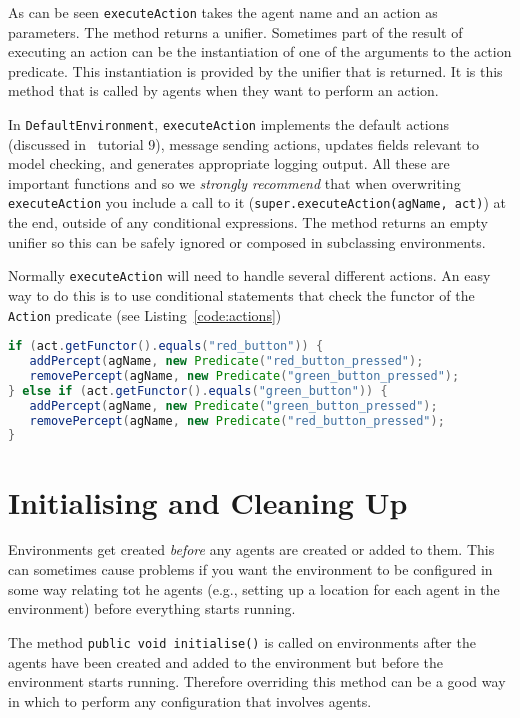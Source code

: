 \documentclass[a4]{article}
\begin{document}
As can be seen \texttt{executeAction} takes the agent name and an action as parameters.  The method returns a unifier.  Sometimes part of the result of executing an action can be the instantiation of one of the arguments to the action predicate.  This instantiation is provided by the unifier that is returned.  It is this method that is called by agents when they want to perform an action.

In \texttt{DefaultEnvironment}, \texttt{executeAction} implements the default actions (discussed in \gwendolen\ tutorial 9), message sending actions, updates fields relevant to model checking, and generates appropriate logging output.   All these are important functions and so we \emph{strongly recommend} that when overwriting \texttt{executeAction} you include a call to it (\texttt{super.executeAction(agName, act)}) at the end, outside of any conditional expressions.  The method returns an empty unifier so this can be safely ignored or composed in subclassing environments.

Normally \texttt{executeAction} will need to handle several different actions.  An easy way to do this is to use conditional statements that check the functor of the \texttt{Action} predicate (see Listing~\ref{code:actions})

\begin{lstlisting}[float,caption=Sample Action Handling Code,basicstyle=\sffamily,language=Java,style=easslisting,label=code:actions]
if (act.getFunctor().equals("red_button")) {
   addPercept(agName, new Predicate("red_button_pressed");
   removePercept(agName, new Predicate("green_button_pressed");
} else if (act.getFunctor().equals("green_button")) {
   addPercept(agName, new Predicate("green_button_pressed");
   removePercept(agName, new Predicate("red_button_pressed");
}
\end{lstlisting}

\section{Initialising and Cleaning Up}
Environments get created \emph{before} any agents are created or added to them.  This can sometimes cause problems if you want the environment to be configured in some way relating tot he agents (e.g., setting up a location for each agent in the environment) before everything starts running.

The method \texttt{public void initialise()} is called on environments after the agents have been created and added to the environment but before the environment starts running.  Therefore overriding this method can be a good way in which to perform any configuration that involves agents.
\end{document}
